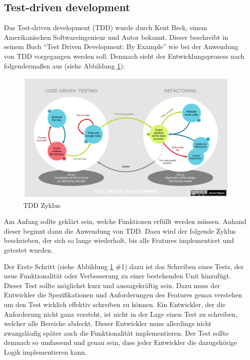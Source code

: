 \subsection{Test-driven development}\label{einleitung:tdd}
Das Test-driven development (TDD) wurde durch Kent Beck, einem Amerikanischen 
Softwareingenieur und Autor bekannt. Dieser beschreibt in seinem Buch "`Test 
Driven Development: By Example"' wie bei der Anwendung von TDD vorgegangen 
werden soll. Demnach sieht der Entwicklungsprozess nach \cite{beck:tdd} 
folgendermaßen aus (siehe Abbildung \ref{abb:einleitung:tdd:zyklus}):
\newline

\begin{figure}
\includegraphics[width=1\textwidth]{abb/tdd.png}
\caption[By Xarawn - Own work, CC BY-SA 4.0,
\url{https://commons.wikimedia.org/w/index.php?curid=44782343}]{TDD Zyklus}
\centering
\label{abb:einleitung:tdd:zyklus}
\end{figure}

Am Anfang sollte geklärt sein, welche Funktionen erfüllt werden müssen. Anhand
dieser beginnt dann die Anwendung von TDD. Dazu wird der folgende Zyklus
beschrieben, der sich so lange wiederholt, bis alle Features implementiert
und getestet wurden.

Der Erste Schritt (siehe Abbildung \ref{abb:einleitung:tdd:zyklus} \#1) dazu ist
das Schreiben eines Tests, der neue Funktionalität oder Verbesserung zu einer
bestehenden Unit hinzufügt. Dieser Test sollte möglichst kurz und
aussagekräftig sein. Dazu muss der Entwickler die Spezifikationen und
Anforderungen des Features genau verstehen um den Test wirklich effektiv
schreiben zu können. Ein Entwickler, der die Anforderung nicht ganz versteht,
ist nicht in der Lage einen Test zu schreiben, welcher alle Bereiche abdeckt.
Dieser Entwickler muss allerdings nicht zwangsläufig später auch die
Funktionalität implementieren. Der Test sollte demnach so umfassend und genau
sein, dass jeder Entwickler die dazugehörige Logik implementieren kann.

